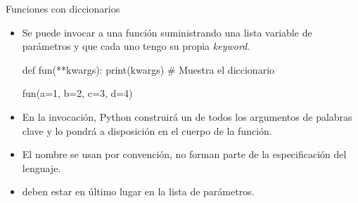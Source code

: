 \documentclass[10pt,envcountsect,spanish]{beamer}
\begin{document}
\begin{frame}[fragile]{Funciones con diccionarios}

\begin{itemize}
\item Se puede invocar a  una función suministrando una lista variable de parámetros y que cada uno tengo su propia \textit{keyword}.


\begin{pyconsole}[][frame=single]
def fun(**kwargs): 
    print(kwargs) # Muestra el diccionario

fun(a=1, b=2, c=3, d=4)
\end{pyconsole}

\item En la invocación, Python construirá un  de todos los argumentos de palabras clave y lo pondrá a disposición en el cuerpo de la función. 

\item El nombre  se usan por convención, no forman parte de la especificación del lenguaje.  



\item {} deben estar en último lugar en la lista de parámetros. 
\end{itemize}

\end{frame}
\end{document}
